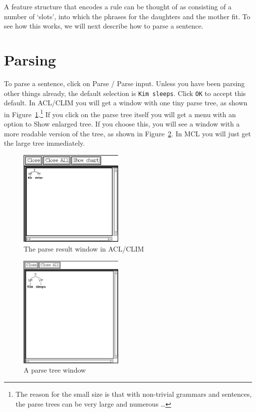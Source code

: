 \documentclass[12pt]{report}
\newcommand{\lkbmenucommand}{{\bf}}
\begin{document}
A feature structure that encodes a rule can be thought of
as consisting of a number of `slots', into which the phrases for
the daughters and the mother fit.  To see how this works,
we will next describe how to parse a sentence.

\section{Parsing}

To parse a sentence, click on {\lkbmenucommand Parse} / {\lkbmenucommand Parse input}.  
Unless you have been parsing other things already,
the default selection is {\tt Kim sleeps}.  Click {\tt OK} to
accept this default.  In ACL/CLIM
you will get a window with one tiny parse
tree, as shown in Figure~\ref{kimsleeps}.\footnote{The reason for the
small size is that with non-trivial grammars and sentences, the parse 
trees can be very large and numerous \ldots} If you click on the parse
tree itself you will get a menu with an option to {\lkbmenucommand Show enlarged tree}.
If you choose this, you will see a window with a more readable version
of the tree, as shown in Figure~\ref{ptree}. In MCL you will just get the 
large tree immediately.
\begin{figure}
\includegraphics[width=2in]{figs/kimsleeps}
\caption{The parse result window in ACL/CLIM}
\label{kimsleeps}
\end{figure}
\begin{figure}
\includegraphics[width=2in]{figs/ptree}
\caption{A parse tree window}
\label{ptree}
\end{figure}
\end{document}
